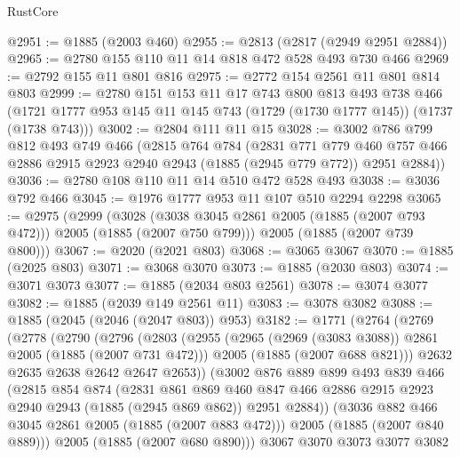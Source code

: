 \begin{lexlean}{RustCore}
\begin{coremodule}
@2951 := @1885 (@2003 @460)
@2955 := @2813 (@2817 (@2949 @2951 @2884))
@2965 := @2780 @155 @110 @11 @14 @818 @472 @528 @493 @730 @466
@2969 := @2792 @155 @11 @801 @816
@2975 := @2772 @154 @2561 @11 @801 @814 @803
@2999 := @2780
    @151
    @153
    @11
    @17
    @743
    @800
    @813
    @493
    @738
    @466
    (@1721 @1777 @953 @145 @11 @145 @743 (@1729 (@1730 @1777 @145)) (@1737 (@1738 @743)))
@3002 := @2804 @111 @11 @15
@3028 := @3002
    @786
    @799
    @812
    @493
    @749
    @466
    (@2815
      @764
      @784
      (@2831
        @771
        @779
        @460
        @757
        @466
        @2886
        @2915
        @2923
        @2940
        @2943
        (@1885 (@2945 @779 @772))
        @2951
        @2884))
@3036 := @2780 @108 @110 @11 @14 @510 @472 @528 @493
@3038 := @3036 @792 @466
@3045 := @1976 @1777 @953 @11 @107 @510 @2294 @2298
@3065 := @2975
    (@2999
      (@3028 (@3038 @3045 @2861 @2005 (@1885 (@2007 @793 @472))) @2005 (@1885 (@2007 @750 @799)))
      @2005
      (@1885 (@2007 @739 @800)))
@3067 := @2020 (@2021 @803)
@3068 := @3065 @3067
@3070 := @1885 (@2025 @803)
@3071 := @3068 @3070
@3073 := @1885 (@2030 @803)
@3074 := @3071 @3073
@3077 := @1885 (@2034 @803 @2561)
@3078 := @3074 @3077
@3082 := @1885 (@2039 @149 @2561 @11)
@3083 := @3078 @3082
@3088 := @1885 (@2045 (@2046 (@2047 @803)) @953)
@3182 := @1771
    (@2764
      (@2769
        (@2778
          (@2790
            (@2796
              (@2803
                (@2955
                  (@2965 (@2969 (@3083 @3088)) @2861 @2005 (@1885 (@2007 @731 @472)))
                  @2005
                  (@1885 (@2007 @688 @821)))
                @2632
                @2635
                @2638
                @2642
                @2647
                @2653))
            (@3002
              @876
              @889
              @899
              @493
              @839
              @466
              (@2815
                @854
                @874
                (@2831
                  @861
                  @869
                  @460
                  @847
                  @466
                  @2886
                  @2915
                  @2923
                  @2940
                  @2943
                  (@1885 (@2945 @869 @862))
                  @2951
                  @2884))
              (@3036 @882 @466 @3045 @2861 @2005 (@1885 (@2007 @883 @472)))
              @2005
              (@1885 (@2007 @840 @889)))
            @2005
            (@1885 (@2007 @680 @890)))
          @3067
          @3070
          @3073
          @3077
          @3082

\end{coremodule}
\end{lexlean}
